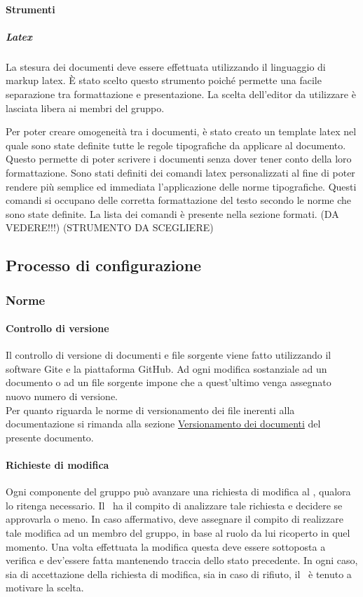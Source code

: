 \documentclass[../NormeProgetto.tex]{subfiles}
\begin{document}
	\paragraph{Strumenti}
		\subparagraph{Latex}
		La stesura dei documenti deve essere effettuata utilizzando il linguaggio di markup latex. È stato scelto questo strumento poiché permette una facile separazione tra formattazione e presentazione. La scelta dell'editor da utilizzare è lasciata libera ai membri del gruppo.
		
			Per poter creare omogeneità tra i documenti, è stato creato un template latex nel quale sono state definite tutte le regole tipografiche da applicare al documento. Questo permette di poter scrivere i documenti senza dover tener conto della loro formattazione.
			Sono stati definiti dei comandi latex personalizzati al fine di poter rendere più semplice ed immediata l'applicazione delle norme tipografiche. Questi comandi si occupano delle corretta formattazione del testo secondo le norme che sono state definite. La lista dei comandi è presente nella sezione formati. (DA VEDERE!!!)
			(STRUMENTO DA SCEGLIERE)

\subsection{Processo di configurazione}
	\subsubsection{Norme}
	\paragraph{Controllo di versione}

	Il controllo di versione di documenti e file sorgente viene fatto utilizzando il software Gite e la piattaforma GitHub. Ad ogni modifica sostanziale ad un documento o ad un file sorgente impone che a quest'ultimo venga assegnato nuovo numero di versione. \\ Per quanto riguarda le norme di versionamento dei file inerenti alla documentazione si rimanda alla sezione \hyperref[sec:Versionamento dei documenti]{Versionamento dei documenti} del presente documento.
	\paragraph{Richieste di modifica}
	Ogni componente del gruppo può avanzare una richiesta di modifica al \responsabilediprogetto, qualora lo ritenga necessario. Il \responsabilediprogetto\ ha il compito di analizzare tale richiesta e decidere se approvarla o meno. In caso affermativo, deve assegnare il compito di realizzare tale modifica ad un membro del gruppo, in base al ruolo da lui ricoperto in quel momento. Una volta effettuata la modifica questa deve essere sottoposta a verifica e dev'essere fatta mantenendo traccia dello stato precedente. In ogni caso, sia di accettazione della richiesta di modifica, sia in caso di rifiuto, il \responsabilediprogetto\ è tenuto a motivare la scelta.
		
\end{document}
